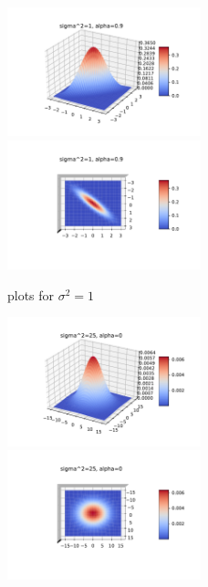 \documentclass[english]{exercisesheet}
\begin{document}
\begin{solution}
\begin{figure}
 \includegraphics[width=0.5\textwidth]{images/plot-1-9-side.pdf} \includegraphics[width=0.5\textwidth]{images/plot-1-9-top.pdf}
 \caption{plots for $\sigma^2=1$}
 \end{figure}
 \begin{figure}
 \includegraphics[width=0.5\textwidth]{images/plot-5-0-side.pdf} \includegraphics[width=0.5\textwidth]{images/plot-5-0-top.pdf}\\

\end{figure}
\end{solution}
\end{document}
